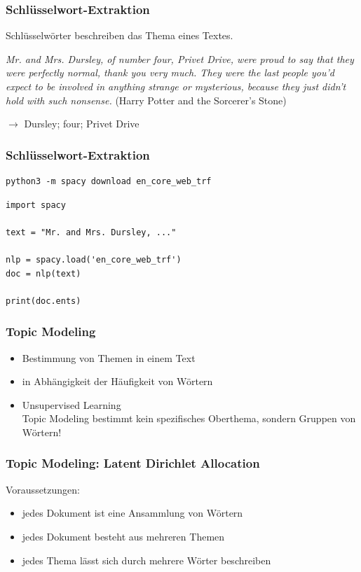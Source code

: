 
\begin{frame}[fragile]
\frametitle{Schlüsselwort-Extraktion}

Schlüsselwörter beschreiben das Thema eines Textes.

\vspace{\baselineskip}

\textit{Mr. and Mrs. Dursley, of number four, Privet Drive, were proud to say that they were perfectly normal, thank you very much. They were the last people you'd expect to be involved in anything strange or mysterious, because they just didn't hold with such nonsense.} {\scriptsize (Harry Potter and the Sorcerer's Stone)}

$\rightarrow$ Dursley; four; Privet Drive
\end{frame}


\begin{frame}[fragile]
\frametitle{Schlüsselwort-Extraktion}

\begin{verbatim}
python3 -m spacy download en_core_web_trf
\end{verbatim}

\begin{verbatim}
import spacy

text = "Mr. and Mrs. Dursley, ..."

nlp = spacy.load('en_core_web_trf')
doc = nlp(text)

print(doc.ents)
\end{verbatim}
\end{frame}


\begin{frame}[fragile]
\frametitle{Topic Modeling}

\begin{itemize}
	\item Bestimmung von Themen in einem Text
	\item in Abhängigkeit der Häufigkeit von Wörtern
	\item Unsupervised Learning \\ {\footnotesize Topic Modeling bestimmt kein spezifisches Oberthema, sondern Gruppen von Wörtern!}
\end{itemize}
\end{frame}


\begin{frame}
\frametitle{Topic Modeling: Latent Dirichlet Allocation}

Voraussetzungen:
\begin{itemize}
	\item jedes Dokument ist eine Ansammlung von Wörtern
	\item jedes Dokument besteht aus mehreren Themen
	\item jedes Thema lässt sich durch mehrere Wörter beschreiben
\end{itemize}
\end{frame}

